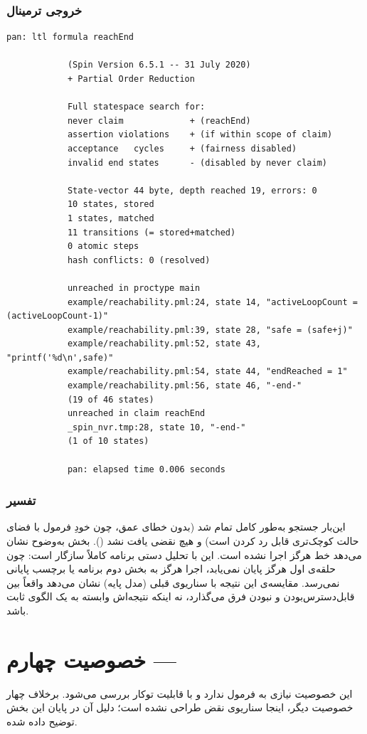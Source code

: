 \documentclass[12pt]{report}
\begin{document}
	\subsubsection{خروجی ترمینال}
	\begin{latin}
		\begin{lstlisting}[style=termstyle]
			pan: ltl formula reachEnd
			
			(Spin Version 6.5.1 -- 31 July 2020)
			+ Partial Order Reduction
			
			Full statespace search for:
			never claim             + (reachEnd)
			assertion violations    + (if within scope of claim)
			acceptance   cycles     + (fairness disabled)
			invalid end states      - (disabled by never claim)
			
			State-vector 44 byte, depth reached 19, errors: 0
			10 states, stored
			1 states, matched
			11 transitions (= stored+matched)
			0 atomic steps
			hash conflicts: 0 (resolved)
			
			unreached in proctype main
			example/reachability.pml:24, state 14, "activeLoopCount = (activeLoopCount-1)"
			example/reachability.pml:39, state 28, "safe = (safe+j)"
			example/reachability.pml:52, state 43, "printf('%d\n',safe)"
			example/reachability.pml:54, state 44, "endReached = 1"
			example/reachability.pml:56, state 46, "-end-"
			(19 of 46 states)
			unreached in claim reachEnd
			_spin_nvr.tmp:28, state 10, "-end-"
			(1 of 10 states)
			
			pan: elapsed time 0.006 seconds
		\end{lstlisting}
	\end{latin}
	
	\subsubsection{تفسیر}
	این‌بار جستجو به‌طور کامل تمام شد (بدون خطای عمق، چون خودِ فرمول  با فضای حالت کوچک‌تری قابل رد کردن است) و هیچ نقضی یافت نشد (). بخش  به‌وضوح نشان می‌دهد خط  هرگز اجرا نشده است. این با تحلیل دستی برنامه کاملاً سازگار است: چون حلقه‌ی اول هرگز پایان نمی‌یابد، اجرا هرگز به بخش دوم برنامه یا برچسب پایانی نمی‌رسد. مقایسه‌ی این نتیجه با سناریوی قبلی (مدل پایه) نشان می‌دهد  واقعاً بین قابل‌دسترس‌بودن و نبودن  فرق می‌گذارد، نه اینکه نتیجه‌اش وابسته به یک الگوی ثابت باشد.
	
	\section{خصوصیت چهارم --- } \label{sec:deadlock}
	این خصوصیت نیازی به فرمول  ندارد و با قابلیت توکار  بررسی می‌شود. برخلاف چهار خصوصیت دیگر، اینجا سناریوی نقض طراحی نشده است؛ دلیل آن در پایان این بخش توضیح داده شده.
	
\end{document}
